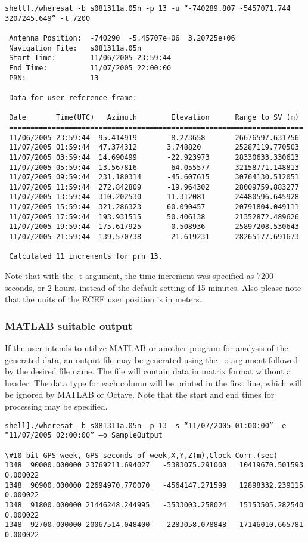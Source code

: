 \begin{verbatim}
shell]./wheresat -b s081311a.05n -p 13 -u “-740289.807 -5457071.744 3207245.649” -t 7200

 Antenna Position:  -740290  -5.45707e+06  3.20725e+06
 Navigation File:   s081311a.05n
 Start Time:        11/06/2005 23:59:44
 End Time:          11/07/2005 22:00:00
 PRN:               13

 Data for user reference frame:

 Date       Time(UTC)   Azimuth        Elevation      Range to SV (m)
 =====================================================================
 11/06/2005 23:59:44  95.414919       -8.273658       26676597.631756
 11/07/2005 01:59:44  47.374312       3.748820        25287119.770503
 11/07/2005 03:59:44  14.690499       -22.923973      28330633.330613
 11/07/2005 05:59:44  13.567816       -64.055577      32158771.148813
 11/07/2005 09:59:44  231.180314      -45.607615      30764130.512051
 11/07/2005 11:59:44  272.842809      -19.964302      28009759.883277
 11/07/2005 13:59:44  310.202530      11.312081       24480596.645928
 11/07/2005 15:59:44  321.286323      60.090457       20791804.049111
 11/07/2005 17:59:44  193.931515      50.406138       21352872.489626
 11/07/2005 19:59:44  175.617925      -0.508936       25897208.530643
 11/07/2005 21:59:44  139.570738      -21.619231      28265177.691673

 Calculated 11 increments for prn 13.
\end{verbatim}

Note that with the -t argument, the time increment was specified as 7200 seconds, or 2 hours, instead of the default setting of 15 minutes. Also please note that the units of the ECEF user position is in meters.

\subsubsection{MATLAB suitable output}

If the user intends to utilize MATLAB or another program for analysis of the generated data, an output file may be generated using the –o argument followed by the desired file name.  The file will contain data in matrix format without a header.  The data type for each column will be printed in the first line, which will be ignored by MATLAB or Octave.  Note that the start and end times for processing may be specified.

\begin{verbatim}
shell]./wheresat -b s081311a.05n -p 13 -s “11/07/2005 01:00:00” -e “11/07/2005 02:00:00” –o SampleOutput

\#10-bit GPS week, GPS seconds of week,X,Y,Z(m),Clock Corr.(sec)
1348  90000.000000 23769211.694027   -5383075.291000   10419670.501593   0.000022 
1348  90900.000000 22694970.770070   -4564147.271599   12898332.239115   0.000022 
1348  91800.000000 21446248.244995   -3533003.258024   15153505.282540   0.000022 
1348  92700.000000 20067514.048400   -2283058.078848   17146010.665781   0.000022 
\end{verbatim}

